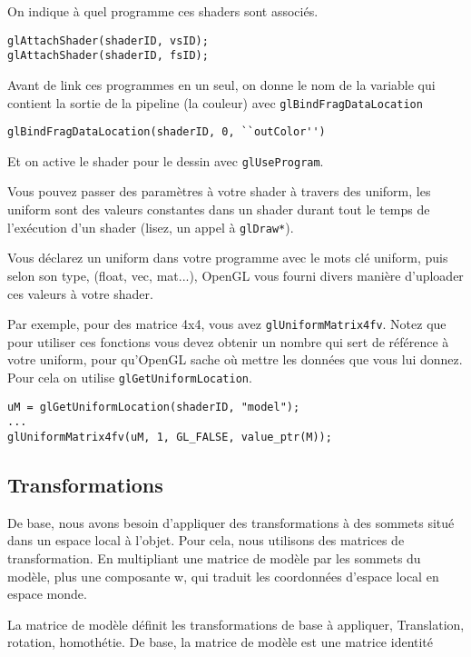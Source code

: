 \documentclass[11pt, a4paper, titlepage]{article}
\begin{document}
On indique à quel programme ces shaders sont associés.

\begin{lstlisting}
glAttachShader(shaderID, vsID);
glAttachShader(shaderID, fsID);
\end{lstlisting}

Avant de link ces programmes en un seul, on donne le nom de la
variable qui contient la sortie de la pipeline (la couleur) avec
\texttt{glBindFragDataLocation}

\begin{lstlisting}
glBindFragDataLocation(shaderID, 0, ``outColor'')
\end{lstlisting}

Et on active le shader pour le dessin avec \texttt{glUseProgram}.

Vous pouvez passer des paramètres à votre shader à travers des
uniform, les uniform sont des valeurs constantes dans un shader durant
tout le temps de l'exécution d'un shader (lisez, un appel à
\texttt{glDraw*}).

Vous déclarez un uniform dans votre programme avec le mots clé
uniform, puis selon son type, (float, vec, mat...), OpenGL vous fourni
divers manière d'uploader ces valeurs à votre shader.

Par exemple, pour des matrice 4x4, vous avez
\texttt{glUniformMatrix4fv}.  Notez que pour utiliser ces fonctions
vous devez obtenir un nombre qui sert de référence à votre uniform,
pour qu'OpenGL sache où mettre les données que vous lui donnez. Pour
cela on utilise \texttt{glGetUniformLocation}.

\begin{lstlisting}
uM = glGetUniformLocation(shaderID, "model");
...
glUniformMatrix4fv(uM, 1, GL_FALSE, value_ptr(M));
\end{lstlisting}

\subsection{Transformations}

De base, nous avons besoin d'appliquer des transformations à des
sommets situé dans un espace local à l'objet.  Pour cela, nous
utilisons des matrices de transformation.  En multipliant une matrice
de modèle par les sommets du modèle, plus une composante w, qui
traduit les coordonnées d'espace local en espace monde.

La matrice de modèle définit les transformations de base à appliquer,
Translation, rotation, homothétie.  De base, la matrice de modèle est
une matrice identité
\end{document}
